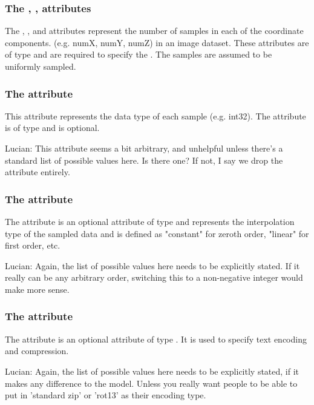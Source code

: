 \subsubsection{The , ,  attributes}
The , , and  attributes represent the number of samples in each of the coordinate components. (e.g. numX, numY, numZ) in an image dataset.  These attributes are of type  and are required to specify the \SampledField. The samples are assumed to be uniformly sampled.

\subsubsection{The  attribute}
This attribute represents the data type of each sample (e.g. int32). The attribute is of type  and is optional.

{\color{red} Lucian: \notice This attribute seems a bit arbitrary, and unhelpful unless there's a standard list of possible values here.  Is there one?  If not, I say we drop the attribute entirely.}


\subsubsection{The  attribute}
The  attribute is an optional attribute of type  and represents the interpolation type of the sampled data and is defined as "constant" for zeroth order, "linear" for first order, etc.

{\color{red} Lucian: \notice Again, the list of possible values here needs to be explicitly stated.  If it really can be any arbitrary order, switching this to a non-negative integer would make more sense.}

\subsubsection{The  attribute}
The  attribute is an optional attribute of type . It is used to specify text encoding and compression.

{\color{red} Lucian: \notice Again, the list of possible values here needs to be explicitly stated, if it makes any difference to the model.  Unless you really want people to be able to put in 'standard zip' or 'rot13' as their encoding type.}


